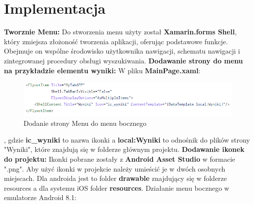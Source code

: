 	\newpage
\section{Implementacja}		%
\textbf{Tworznie Menu:} \newline
Do stworzenia menu użyty został \textbf{Xamarin.forms Shell}, który zmiejsza złożoność tworzenia aplikacji, oferując podstawowe funkcje. Obejmuje on wspólne środowisko użytkownika nawigacji, schematu nawigacji i zintegrowanej procedury obsługi wyszukiwania.
\newline
\newline
\textbf{Dodawanie strony do menu na przykładzie elementu wyniki:}
\newline
W pliku \textbf{MainPage.xaml}:
\newline
\newline
\begin{figure}[!htb]
	\begin{center}
		\includegraphics[width=12cm]{rys/item.png}
		\caption{Dodanie strony Menu do menu bocznego}
		\label{rys:rysunek007}
	\end{center}
\end{figure}
\newline
, gdzie \textbf{ic\_wyniki} to nazwa ikonki a \textbf{local:Wyniki} to odnośnik do plików strony "Wyniki", które znajdują się w folderze głównym projektu. 
\newline
\newline
\textbf{Dodawanie ikonek do projektu:} \newline
Ikonki pobrane zostały z \textbf{Android Asset Studio} w formacie ".png". \newline
Aby użyć ikonki w projekcie należy umieścić je w dwóch osobnych miejscach. Dla androida jest to folder \textbf{drawable} znajdujący się w folderze resources a dla systemu iOS folder \textbf{resources}.
\newline \newline
\newpage
Działanie menu bocznego w emulatorze Android 8.1:
